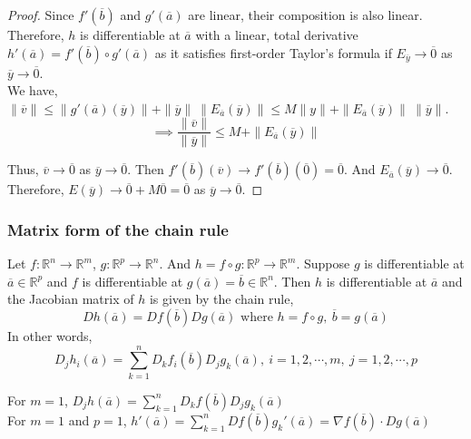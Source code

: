 \begin{proof}
	Since $f'(\overline{b})$ and $g'(\overline{a})$ are linear, their composition is also linear. Therefore, $h$ is differentiable at $\overline{a}$ with a linear, total derivative $h'(\overline{a}) = f'(\overline{b}) \circ g'(\overline{a})$ as it satisfies first-order Taylor's formula if $E_{\overline{y}} \to \overline{0}$ as $\overline{y} \to \overline{0}$. \\

	We have, $\|\overline{v}\| \le \|g'(\overline{a})(\overline{y})\| + \|\overline{y}\|\ \|E_{\overline{a}}(\overline{y})\| \le M\|y\| + \|E_{\overline{a}}(\overline{y})\|\ \|\overline{y}\|$.
	\[ \implies \frac{\|\overline{v}\|}{\|\overline{y}\|} \le M + \|E_{\overline{a}}(\overline{y})\| \]

	Thus, $\overline{v} \to \overline{0}$ as $\overline{y} \to \overline{0}$. Then $f'(\overline{b})(\overline{v}) \to f'(\overline{b})(\overline{0}) = \overline{0}$. And $E_{\overline{a}}(\overline{y}) \to \overline{0}$. Therefore, $E(\overline{y}) \to \overline{0} + M\overline{0} = \overline{0}$ as $\overline{y} \to \overline{0}$.
\end{proof}
\subsubsection{Matrix form of the chain rule}
	Let $f : \mathbb{R}^n \to \mathbb{R}^m$, $g : \mathbb{R}^p \to \mathbb{R}^n$. And $h = f \circ g : \mathbb{R}^p \to \mathbb{R}^m$. Suppose $g$ is differentiable at $\overline{a} \in \mathbb{R}^p$ and $f$ is differentiable at $g(\overline{a}) = \overline{b} \in \mathbb{R}^n$. Then $h$ is differentiable at $\overline{a}$ and the Jacobian matrix of $h$ is given by the chain rule,
\[ Dh(\overline{a}) = Df(\overline{b})Dg(\overline{a}) \text{ where } h = f \circ g,\ \overline{b} = g(\overline{a})\]
In other words,
\[ D_jh_i(\overline{a}) = \sum_{k=1}^n D_k f_i(\overline{b}) D_j g_k(\overline{a}),\ i=1,2,\cdots,m,\ j=1,2,\cdots,p \]

	For $m=1$, $D_j h(\overline{a}) = \sum_{k=1}^n D_kf(\overline{b}) D_jg_k(\overline{a})$\\
	
	For $m=1$ and $p=1$, $h'(\overline{a}) = \sum_{k=1}^n Df(\overline{b}) g_k'(\overline{a}) = \nabla f(\overline{b}) \cdot Dg(\overline{a})$

